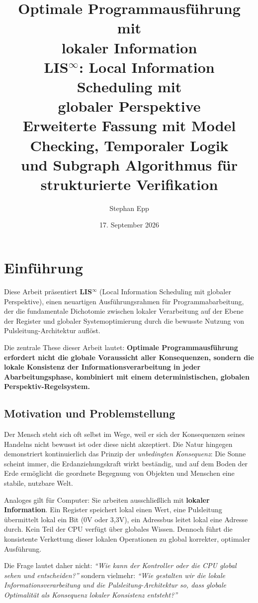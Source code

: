 \documentclass[a4paper,12pt]{article}
\title{\textbf{Optimale Programmausführung mit\\ lokaler Information}\\
	LIS$^{\infty}$: Local Information Scheduling mit\\ globaler Perspektive\\
	\large{Erweiterte Fassung mit Model Checking, Temporaler Logik\\
	und Subgraph Algorithmus für strukturierte Verifikation}}
\author{Stephan Epp}
\date{17. September 2026}
\theoremstyle{definition}
\begin{document}
	
\maketitle

\tableofcontents
\newpage

\section{Einführung}
\label{sec:einfuehrung}

Diese Arbeit präsentiert \textbf{LIS$^{\infty}$} (Local Information Scheduling mit globaler Perspektive), einen neuartigen Ausführungsrahmen für Programmabarbeitung, der die fundamentale Dichotomie zwischen lokaler Verarbeitung auf der Ebene der Register und globaler Systemoptimierung durch die bewusste Nutzung von Pulsleitung-Architektur auflöst. 

Die zentrale These dieser Arbeit lautet: \textbf{Optimale Programmausführung erfordert nicht die globale Voraussicht aller Konsequenzen, sondern die lokale Konsistenz der Informationsverarbeitung in jeder Abarbeitungsphase, kombiniert mit einem deterministischen, globalen Perspektiv-Regelsystem.}

\subsection{Motivation und Problemstellung}

Der Mensch steht sich oft selbst im Wege, weil er sich der Konsequenzen seines Handelns nicht bewusst ist oder diese nicht akzeptiert. Die Natur hingegen demonstriert kontinuierlich das Prinzip der \emph{unbedingten Konsequenz}: Die Sonne scheint immer, die Erdanziehungskraft wirkt beständig, und auf dem Boden der Erde ermöglicht die geordnete Begegnung von Objekten und Menschen eine stabile, nutzbare Welt.

Analoges gilt für Computer: Sie arbeiten ausschließlich mit \textbf{lokaler Information}. Ein Register speichert lokal einen Wert, eine Pulsleitung übermittelt lokal ein Bit (0V oder 3,3V), ein Adressbus leitet lokal eine Adresse durch. Kein Teil der CPU verfügt über globales Wissen. Dennoch führt die konsistente Verkettung dieser lokalen Operationen zu global korrekter, optimaler Ausführung.

Die Frage lautet daher nicht: \textit{``Wie kann der Kontroller oder die CPU global sehen und entscheiden?''} sondern vielmehr: \textit{``Wie gestalten wir die lokale Informationsverarbeitung und die Pulsleitung-Architektur so, dass globale Optimalität als Konsequenz lokaler Konsistenz entsteht?''}
\end{document}
